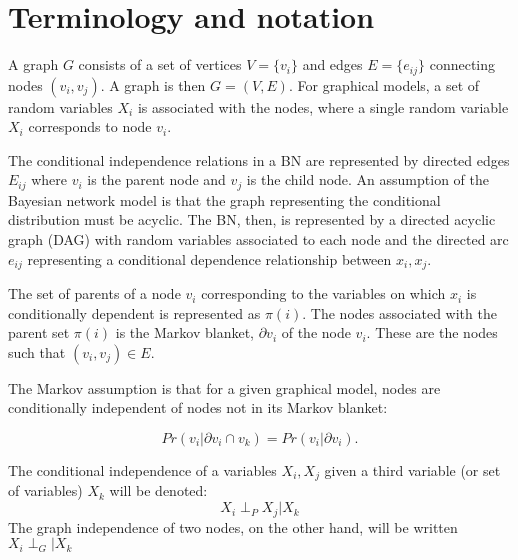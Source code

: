     \section{Terminology and notation}
 

    A graph $G$ consists of a set of vertices $V = \{ v_i \}$ 
    and edges $E = \{ e_{ij} \}$
    connecting nodes $(v_i, v_j)$. A graph is then $G = (V,E) $. 
    For graphical models, a set of random variables $X_i$ is
    associated with the nodes, where a single
    random variable $X_i$ corresponds to node $v_i$. 


    The conditional independence relations in a BN are
    represented by directed edges $E_{ij}$ where $v_i$ is
    the parent node and $v_j$ is the child node. An assumption of
    the Bayesian network model is that the graph representing the 
    conditional distribution must be acyclic. The BN, then, 
    is represented
    by a directed acyclic graph (DAG) with random variables
    associated to each node and the directed arc $e_{ij}$ representing
    a conditional dependence relationship between $x_i, x_j$. 
    

    The set of parents of a node $v_i$ corresponding to the 
    variables on which $x_i$ is conditionally dependent is
    represented as $\pi(i)$. The nodes associated with
    the parent set $\pi(i)$ is the Markov blanket, $\partial v_i$
    of the node $v_i$. These are the nodes such that 
    $(v_i, v_j) \in E$. 

    The Markov assumption is that for
    a given graphical model, nodes are conditionally independent
    of nodes not in its Markov blanket:
    
    \[
         Pr(v_i|\partial v_i \cap v_k) = Pr(v_i | \partial v_i).
    \]

    The conditional independence of a variables $X_i, X_j$ given
    a third variable (or set of variables) $X_k$ will be denoted:  
    \[
        X_i \perp_P X_j | X_k
    \]
    The graph independence of two nodes, on the other hand, will
     be written $X_i \perp_G | X_k$ \cite{Zhou2007}

    


